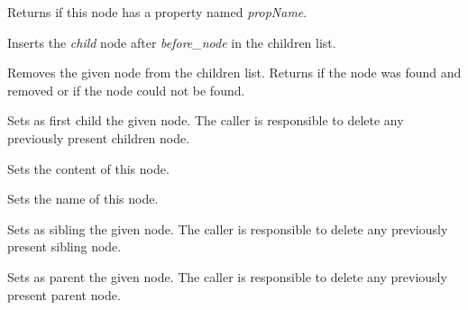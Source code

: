 
Returns \true if this node has a property named {\it propName}.

\label{wxxmlnodeinsertchild}


Inserts the {\it child} node after {\it before\_node} in the children list.

\label{wxxmlnoderemovechild}


Removes the given node from the children list. Returns \true if the node was found and removed
or \false if the node could not be found.

\label{wxxmlnodesetchildren}


Sets as first child the given node. The caller is responsible to delete any previously present
children node.

\label{wxxmlnodesetcontent}


Sets the content of this node.

\label{wxxmlnodesetname}


Sets the name of this node.

\label{wxxmlnodesetnext}


Sets as sibling the given node. The caller is responsible to delete any previously present
sibling node.

\label{wxxmlnodesetparent}


Sets as parent the given node. The caller is responsible to delete any previously present
parent node.

\label{wxxmlnodesetproperties}

